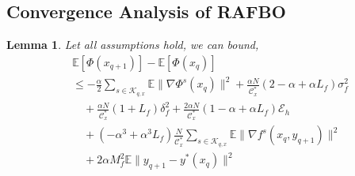 \documentclass[lettersize,journal]{IEEEtran}
\newtheorem{lemma}{Lemma}
\begin{document}
\subsection{Convergence Analysis of RAFBO}
\begin{lemma}
    Let all assumptions hold, we can bound,
    \begin{align}
&\mathbb{E}\left[\Phi(x_{q+1})\right]-\mathbb{E}\left[\Phi(x_q)\right]\\
&\leq-\frac{\alpha}{2}\sum_{s\in \mathcal{K}_{q,x}}\mathbb{E}\|\nabla \Phi^s(x_{q})\|^2+\frac{\alpha N}{\mathcal{C}_x^*}(2-\alpha+\alpha L_f)\sigma_f^2\nonumber\\
&\quad+\frac{\alpha N}{\mathcal{C}_x^*}(1+L_f)\delta^2_f+\frac{2\alpha N}{\mathcal{C}_x^*}(1-\alpha+\alpha L_f)\mathcal{E}_h\nonumber\\
&\quad+(-\alpha^3+\alpha^3 L_f)\frac{N}{\mathcal{C}_x^*}\sum_{s\in \mathcal{K}_{q,x}}\mathbb{E}\|\nabla f^s(x_{q},y_{q+1})\|^2\nonumber\\
&\quad+2\alpha M_f^2\mathbb{E}\|y_{q+1}-y^*(x_q)\|^2\nonumber
\end{align}
\end{lemma}
\end{document}

